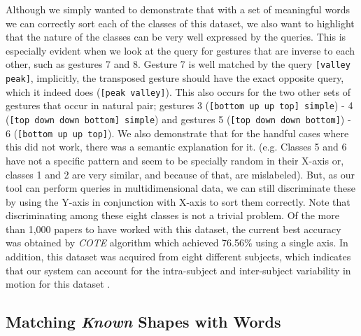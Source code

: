 Although we simply wanted to demonstrate that with a set of meaningful words we can correctly sort each of the classes of this dataset, we also want to highlight that the nature of the classes can be very well expressed by the queries. This is especially evident when we look at the query for gestures that are inverse to each other, such as gestures 7 and 8. Gesture 7 is well matched by the query \texttt{[valley peak]}, implicitly, the transposed gesture should have the exact opposite query, which it indeed does (\texttt{[peak valley]}). This also occurs for the two other sets of gestures that occur in natural pair; gestures 3 (\texttt{[bottom up up top] simple}) - 4 (\texttt{[top down down bottom] simple}) and gestures  5 (\texttt{[top down down bottom]}) - 6 (\texttt{[bottom up up top]}).
We also demonstrate that for the handful cases where this did not work, there was a semantic explanation for it. (e.g. Classes 5 and 6 have not a specific pattern and seem to be specially random in their X-axis or, classes 1 and 2 are very similar, and because of that, are mislabeled). But, as our tool can perform queries in multidimensional data, we can still  discriminate these by using the Y-axis in conjunction with X-axis to sort them correctly. 
Note that discriminating among these eight classes is not a trivial problem. Of the more than 1,000 papers to have worked with this dataset, the current best accuracy was obtained by \textit{COTE} algorithm which achieved 76.56\% using a single axis. In addition, this dataset was acquired from eight different subjects, which indicates that our system can account for the intra-subject and inter-subject variability in motion for this dataset \cite{uWave}.

\subsection{Matching \textit{Known} Shapes with Words}

